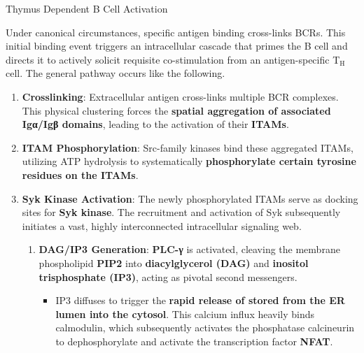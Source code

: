       \begin{core}{Thymus Dependent B Cell Activation}

        Under canonical circumstances, specific antigen binding cross-links BCRs. This initial binding event triggers an intracellular cascade that primes the B cell and directs it to actively solicit requisite co-stimulation from an antigen-specific T$_\text{H}$ cell. The general pathway occurs like the following.

        \begin{enumerate}[label=(\arabic*)]

          \item \textbf{Crosslinking}: Extracellular antigen cross-links multiple BCR complexes. This physical clustering forces the \textbf{spatial aggregation of associated Igα/Igβ domains}, leading to the activation of their \textbf{ITAMs}.

          \item \textbf{ITAM Phosphorylation}: Src-family kinases bind these aggregated ITAMs, utilizing ATP hydrolysis to systematically \textbf{phosphorylate certain tyrosine residues on the ITAMs}.

          \item \textbf{Syk Kinase Activation}: The newly phosphorylated ITAMs serve as docking sites for \textbf{Syk kinase}. The recruitment and activation of Syk subsequently initiates a vast, highly interconnected intracellular signaling web.


          \begin{enumerate}

            \item \textbf{DAG/IP3 Generation}: \textbf{PLC-γ} is activated, cleaving the membrane phospholipid \textbf{PIP2} into \textbf{diacylglycerol (DAG)} and \textbf{inositol trisphosphate (IP3)}, acting as pivotal second messengers.

            \begin{itemize}

              \item IP3 diffuses to trigger the \textbf{rapid release of stored  from the ER lumen into the cytosol}. This calcium influx heavily binds calmodulin, which subsequently activates the phosphatase calcineurin to dephosphorylate and activate the transcription factor \textbf{NFAT}.


\end{itemize}
\end{enumerate}
\end{enumerate}
\end{core}
